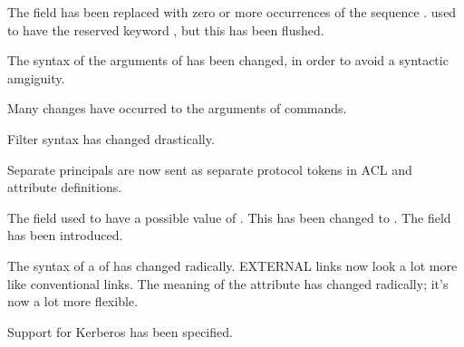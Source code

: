 The  field has been replaced with zero or more
occurrences of the sequence   .
 used to have the reserved keyword , but
this has been flushed.

The syntax of the arguments of
 has been changed, in order to avoid a syntactic
amgiguity.   

Many changes have occurred to the arguments of commands.  

Filter syntax has changed drastically.  

Separate principals are now sent as separate protocol tokens in ACL
and attribute definitions.

The  field used to have a possible value of
.  This has been changed to .  The
 field has been introduced.

The syntax of a  of  has changed
radically.  EXTERNAL links now look a lot more like conventional links.
The meaning of the  attribute has changed radically;
it's now a lot more flexible.

Support for Kerberos has been specified.


